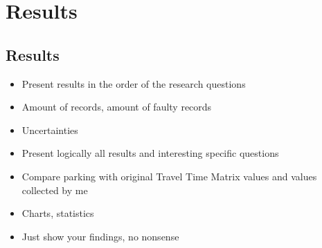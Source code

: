 \section{Results}
\justify

\subsection{Results}
\justify
\begin{itemize}
  \item Present results in the order of the research questions
  \item Amount of records, amount of faulty records
  \item Uncertainties
  \item Present logically all results and interesting specific questions
  \item Compare parking with original Travel Time Matrix values and values collected by me
  \item Charts, statistics
  \item Just show your findings, no nonsense
\end{itemize}